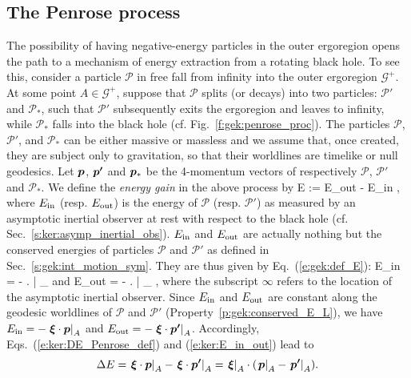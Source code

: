 \subsection{The Penrose process} \label{s:gek:Penrose_proc}

The possibility of having negative-energy particles in the outer ergoregion opens the path
to a mechanism of energy extraction from a rotating black hole.
To see this, consider a particle $\mathscr{P}$
in free fall from infinity into the outer ergoregion $\mathscr{G}^+$. At some point $A\in \mathscr{G}^+$, suppose that $\mathscr{P}$
splits (or decays) into two particles: $\mathscr{P}'$
and $\mathscr{P}_*$, such that $\mathscr{P}'$
subsequently exits the ergoregion and leaves to infinity,
while $\mathscr{P}_*$ falls into the black hole (cf. Fig.~\ref{f:gek:penrose_proc}).
The particles $\mathscr{P}$, $\mathscr{P}'$,
and $\mathscr{P}_*$ can be either massive or massless and we
assume that, once created, they are subject only to gravitation, so that their worldlines are
timelike or null geodesics. Let $\bm{p}$,  $\bm{p'}$ and $\bm{p}_*$
be the 4-momentum vectors of respectively $\mathscr{P}$, $\mathscr{P}'$ and $\mathscr{P}_*$.
We define the \emph{energy gain} in the above process by
\be \label{e:ker:DE_Penrose_def}
    \Delta E := E_{\rm out} - E_{\rm in} ,
\ee
where $E_{\rm in}$ (resp. $E_{\rm out}$) is the energy of $\mathscr{P}$
(resp. $\mathscr{P}'$) as measured by an asymptotic inertial observer
at rest with respect to the black hole (cf. Sec.~\ref{s:ker:asymp_inertial_obs}).
$E_{\rm in}$ and $E_{\rm out}$ are actually nothing but the conserved
energies of particles $\mathscr{P}$ and $\mathscr{P}'$ as defined in
Sec.~\ref{s:gek:int_motion_sym}. They are thus given by Eq.~(\ref{e:gek:def_E}):
\be \label{e:ker:E_in_out}
    E_{\rm in} = - \left.  \w{\xi} \cdot {} \right| _{\infty}
    \qquad \mbox{and}\qquad
    E_{\rm out} = - \left.  \w{\xi} \cdot {} \right| _{\infty}  ,
\ee
where the subscript $\infty$ refers to the location of the asymptotic inertial observer.
Since $E_{\rm in}$ and $E_{\rm out}$ are constant along the geodesic worldlines
of $\mathscr{P}$ and $\mathscr{P}'$ (Property~\ref{p:gek:conserved_E_L}), we have
$E_{\rm in} = - \left. \bm{\xi} \cdot \bm{p} \right| _{A}$
and $E_{\rm out} = - \left. \bm{\xi} \cdot \bm{p'} \right| _{A}$. Accordingly, Eqs.~(\ref{e:ker:DE_Penrose_def}) and
(\ref{e:ker:E_in_out}) lead to
\[
    \Delta E = \left. \bm{\xi} \cdot \bm{p} \right| _{A} - \left. \bm{\xi} \cdot \bm{p'} \right| _{A} =
    \left.  \bm{\xi} \right| _{A} \cdot (\left. \bm{p} \right| _{A}
        - \left. \bm{p'} \right| _{A}) .
\]
